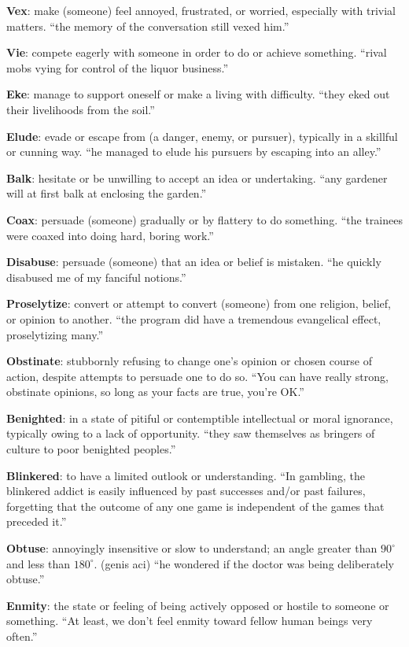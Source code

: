 \documentclass[12pt, a4paper]{ximera}
\begin{document}
\textbf{Vex}: make (someone) feel annoyed, frustrated, or worried, especially with trivial matters. ``the memory of the conversation still vexed him.''

\textbf{Vie}: compete eagerly with someone in order to do or achieve something. ``rival mobs vying for control of the liquor business.''

\textbf{Eke}: manage to support oneself or make a living with difficulty. ``they eked out their livelihoods from the soil.''

\textbf{Elude}: evade or escape from (a danger, enemy, or pursuer), typically in a skillful or cunning way. ``he managed to elude his pursuers by escaping into an alley.''

\textbf{Balk}: hesitate or be unwilling to accept an idea or undertaking. ``any gardener will at first balk at enclosing the garden.''

\textbf{Coax}: persuade (someone) gradually or by flattery to do something. ``the trainees were coaxed into doing hard, boring work.''

\textbf{Disabuse}: persuade (someone) that an idea or belief is mistaken. ``he quickly disabused me of my fanciful notions.''

\textbf{Proselytize}: convert or attempt to convert (someone) from one religion, belief, or opinion to another. ``the program did have a tremendous evangelical effect, proselytizing many.'' 

\textbf{Obstinate}: stubbornly refusing to change one's opinion or chosen course of action, despite attempts to persuade one to do so. ``You can have really strong, obstinate opinions, so long as your facts are true, you're OK.''

\textbf{Benighted}: in a state of pitiful or contemptible intellectual or moral ignorance, typically owing to a lack of opportunity. ``they saw themselves as bringers of culture to poor benighted peoples.''

\textbf{Blinkered}: to have a limited outlook or understanding. ``In gambling, the blinkered addict is easily influenced by past successes and/or past failures, forgetting that the outcome of any one game is independent of the games that preceded it.''

\textbf{Obtuse}: annoyingly insensitive or slow to understand; an angle greater than $90^\circ$ and less than $180^\circ$. (genis aci) ``he wondered if the doctor was being deliberately obtuse.''

\textbf{Enmity}: the state or feeling of being actively opposed or hostile to someone or something. ``At least, we don't feel enmity toward fellow human beings very often.''
\end{document}

